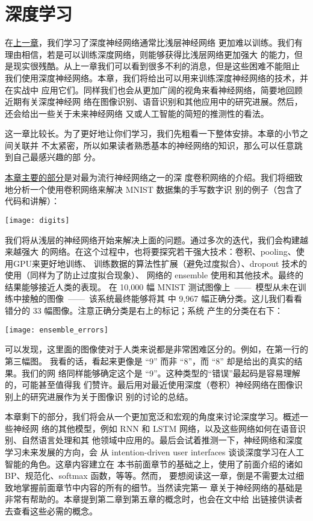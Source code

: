 
\chapter{深度学习}
\label{ch:Deeplearning}

在\hyperref[ch:WhyHardToTrain]{上一章}，我们学习了深度神经网络通常比浅层神经网络
更加难以训练。我们有理由相信，若是可以训练深度网络，则能够获得比浅层网络更加强大
的能力，但是现实很残酷。从上一章我们可以看到很多不利的消息，但是这些困难不能阻止
我们使用深度神经网络。本章，我们将给出可以用来训练深度神经网络的技术，并在实战中
应用它们。同样我们也会从更加广阔的视角来看神经网络，简要地回顾近期有关深度神经网
络在图像识别、语音识别和其他应用中的研究进展。然后，还会给出一些关于未来神经网络
又或人工智能的简短的推测性的看法。

这一章比较长。为了更好地让你们学习，我们先粗看一下整体安排。本章的小节之间关联并
不太紧密，所以如果读者熟悉基本的神经网络的知识，那么可以任意跳到自己最感兴趣的部
分。

\hyperref[sec:convolutional_networks]{本章主要的部分}是对最为流行神经网络之一的深
度卷积网络的介绍。我们将细致地分析一个使用卷积网络来解决 MNIST 数据集的手写数字识
别的例子（包含了代码和讲解）：
\begin{center}
  \texttt{[image: digits]}
\end{center}

我们将从浅层的神经网络开始来解决上面的问题。通过多次的迭代，我们会构建越来越强大
的网络。在这个过程中，也将要探究若干强大技术：卷积、pooling、使用GPU来更好地训练、
训练数据的算法性扩展（避免过度拟合）、dropout 技术的使用（同样为了防止过度拟合现象）、
网络的 ensemble 使用和其他技术。最终的结果能够接近人类的表现。
在 10,000 幅 MNIST 测试图像上~——~模型从未在训练中接触的图像~——~该系统最终能够将其
中 9,967 幅正确分类。这儿我们看看错分的 33 幅图像。注意正确分类是右上的标记；系统
产生的分类在右下：
\begin{center}
  \texttt{[image: ensemble\_errors]}
\end{center}

可以发现，这里面的图像使对于人类来说都是非常困难区分的。例如，在第一行的第三幅图。
我看的话，看起来更像是 “9” 而非 “8”，而 “8” 却是给出的真实的结果。我们的网
络同样能够确定这个是 “9”。这种类型的“错误”最起码是容易理解的，可能甚至值得我
们赞许。最后用对最近使用深度（卷积）神经网络在图像识别上的研究进展作为关于图像识
别的讨论的总结。

本章剩下的部分，我们将会从一个更加宽泛和宏观的角度来讨论深度学习。概述一些神经网
络的其他模型，例如 RNN 和 LSTM 网络，以及这些网络如何在语音识别、自然语言处理和其
他领域中应用的。最后会试着推测一下，神经网络和深度学习未来发展的方向，会
从 intention-driven user interfaces 谈谈深度学习在人工智能的角色。这章内容建立在
本书前面章节的基础之上，使用了前面介绍的诸如 BP、规范化、softmax 函数，等等。然而，
要想阅读这一章，倒是不需要太过细致地掌握前面章节中内容的所有的细节。当然读完第一
章关于神经网络的基础是非常有帮助的。本章提到第二章到第五章的概念时，也会在文中给
出链接供读者去查看这些必需的概念。

